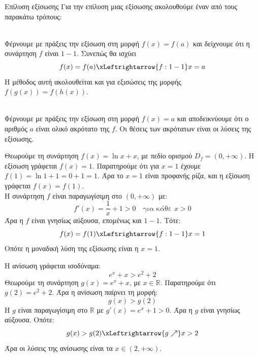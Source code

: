 \begin{askhsh}{Επίλυση εξίσωσης}
Για την επίλυση μιας εξίσωσης ακολουθούμε έναν από τους παρακάτω τρόπους:
\begin{periptwsh}
\item {}\\
Φέρνουμε με πράξεις την εξίσωση στη μορφή $ f(x)=f(a) $ και δείχνουμε ότι η συνάρτηση $ f $ είναι $ 1-1 $. Συνεπώς θα ισχύει
\[ f(x)=f(a)\xLeftrightarrow{f:1-1} x=a \]
Η μέθοδος αυτή ακολουθείται και για εξισώσεις της μορφής $ f(g(x))=f(h(x)) $.
\item {}\\
Φέρνουμε με πράξεις την εξίσωση στη μορφή $ f(x)=a $ και αποδεικνύουμε ότι ο αριθμός $ a $ είναι ολικό ακρότατο της $ f $. Οι θέσεις των ακρότατων είναι οι λύσεις της εξίσωσης.
\end{periptwsh}
\end{askhsh}


\lysh\vspace{-5mm}
\begin{alist}
\item Θεωρούμε τη συνάρτηση $f(x) = \ln x + x$, με πεδίο ορισμού $D_f = (0, +\infty)$.
Η εξίσωση γράφεται $f(x) = 1$.
Παρατηρούμε ότι για $x = 1$ έχουμε $f(1) = \ln 1 + 1 = 0 + 1 = 1$. Άρα το $x = 1$ είναι προφανής ρίζα, και η εξίσωση γράφεται $f(x) = f(1)$.\\
Η συνάρτηση $f$ είναι παραγωγίσιμη στο $(0, +\infty)$ με:
\[ f'(x) = \frac{1}{x} + 1 > 0 \quad \text{για κάθε } x > 0 \]
Άρα η $f$ είναι γνησίως αύξουσα, επομένως και $1-1$. Τότε:
\[ f(x) = f(1) \xLeftrightarrow{f:1-1} x = 1 \]
Οπότε η μοναδική λύση της εξίσωσης είναι η $x = 1$.
\item Η ανίσωση γράφεται ισοδύναμα:
\[ e^x + x > e^2 + 2 \]
Θεωρούμε τη συνάρτηση $g(x) = e^x + x$, με $x \in \mathbb{R}$.
Παρατηρούμε ότι $g(2) = e^2 + 2$. Άρα η ανίσωση παίρνει τη μορφή:
\[ g(x) > g(2) \]
Η $g$ είναι παραγωγίσιμη στο $\mathbb{R}$ με $g'(x) = e^x + 1 > 0$. Άρα η $g$ είναι γνησίως αύξουσα. 
Οπότε:
\[ g(x) > g(2) \xLeftrightarrow{g \nearrow} x > 2 \]
Άρα οι λύσεις της ανίσωσης είναι τα $x \in (2, +\infty)$.
\end{alist}

